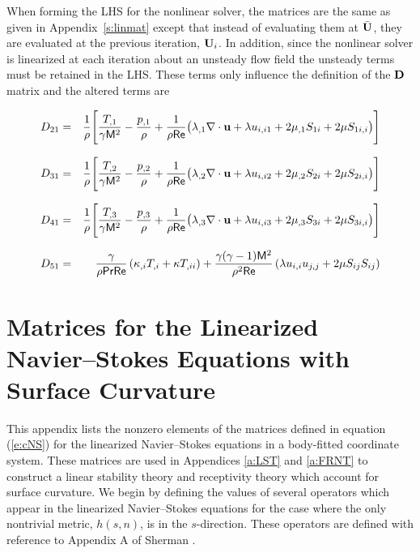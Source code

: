 When forming the LHS for the nonlinear solver, the matrices are the same as
given in Appendix~\ref{s:linmat} except that instead of evaluating them at
$\bar{{\bf U}}$, they are evaluated at the previous iteration, ${\bf U}_{i}$.  In
addition, since the nonlinear solver is linearized at each iteration about an
unsteady flow field the unsteady terms must be retained in the LHS.  These
terms only influence the definition of the ${\bf D}$ matrix and the altered terms
are

\bigskip
{}
%
\begin{eqnarray} 
  D_{21} &=& \frac{1}{\rho} \Bigg[ \frac{ T_{,1}}{\gamma {\sf M}^2} -
             \frac{ p_{,1}}{\rho} + 
             {\frac{1}{\rho{\sf Re}}}\big( \lambda_{,1} {\nabla \cdot {\bf u}} + \lambda  u_{i,i1} + 
             2\mu_{,1}  S_{1i} + 2\mu  S_{1i,i}\big) \Bigg] \\[0.1in]
  D_{31} &=& \frac{1}{\rho} \Bigg[ \frac{ T_{,2}}{\gamma {\sf M}^2} -
             \frac{ p_{,2}}{\rho} + 
             {\frac{1}{\rho{\sf Re}}}\big( \lambda_{,2} {\nabla \cdot {\bf u}} + \lambda  u_{i,i2} + 
             2\mu_{,2}  S_{2i} + 2\mu  S_{2i,i}\big) \Bigg] \\[0.1in]
  D_{41} &=& \frac{1}{\rho} \Bigg[ \frac{ T_{,3}}{\gamma {\sf M}^2} -
             \frac{ p_{,3}}{\rho} + 
             {\frac{1}{\rho{\sf Re}}}\big( \lambda_{,3} {\nabla \cdot {\bf u}} + \lambda  u_{i,i3} + 
             2\mu_{,3}  S_{3i} + 2\mu  S_{3i,i}\big) \Bigg] \\[0.1in]
  D_{51} &=& \frac{\gamma}{\rho{\sf Pr}{\sf Re}} \left( \kappa_{,i} 
              T_{,i} + \kappa  T_{,ii} \right) + 
	     \frac{\gamma(\gamma-1){\sf M}^2}{\rho^2{\sf Re}} 
	     \left( \lambda  u_{i,i} 
	      u_{j,j} + 2 \mu  S_{ij}  S_{ij} \right)
\end{eqnarray}


\pagebreak
\section[Matrices for the Linearized Navier--Stokes Equations with 
\protect\\ Surface Curvature]{Matrices for the Linearized \protect\\ 
Navier--Stokes Equations with \protect\\ Surface Curvature 
\label{a:curvmat}}

This appendix lists the nonzero elements of the matrices defined in equation
(\ref{e:cNS}) for the linearized Navier--Stokes equations in a body-fitted
coordinate system.  These matrices are used in Appendices \ref{a:LST} and
\ref{a:FRNT} to construct a linear stability theory and receptivity theory
which account for surface curvature.  We begin by defining the values of
several operators which appear in the linearized Navier--Stokes equations for
the case where the only nontrivial metric, $h(s,n)$, is in the $s$-direction.
These operators are defined with reference to Appendix A of Sherman
\cite{Sherman:90}.

